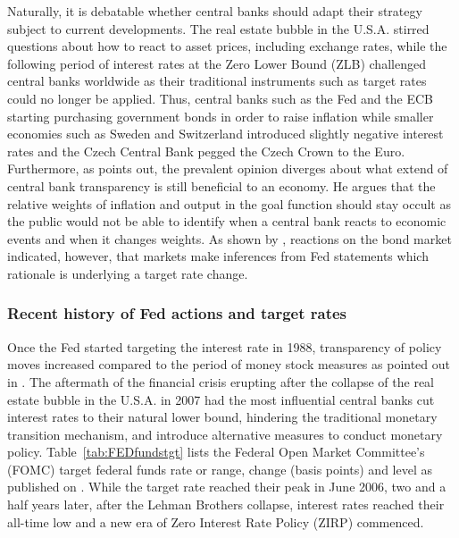 Naturally, it is debatable whether central banks should adapt their strategy subject to current developments. The real estate bubble in the U.S.A. stirred questions about how to react to asset prices, including exchange rates, while the following period of interest rates at the Zero Lower Bound (ZLB) challenged central banks worldwide as their traditional instruments such as target rates could no longer be applied. Thus, central banks such as the Fed and the ECB starting purchasing government bonds in order to raise inflation while smaller economies such as Sweden and Switzerland introduced slightly negative interest rates and the Czech Central Bank pegged the Czech Crown to the Euro. Furthermore, as \textcite{Mishkin.2007} points out, the prevalent opinion diverges about what extend of central bank transparency is still beneficial to an economy. He argues that the relative weights of inflation and output in the goal function should stay occult as the public would not be able to identify when a central bank reacts to economic events and when it changes weights. As shown by \textcite{Ellingsen.2001}, reactions on the bond market indicated, however, that markets make inferences from Fed statements which rationale is underlying a target rate change. %


\subsubsection{Recent history of Fed actions and target rates}

Once the Fed started targeting the interest rate in 1988, transparency of policy moves increased compared to the period of money stock measures as pointed out in \textcite{Ellingsen.2003}. The aftermath of the financial crisis erupting after the collapse of the real estate bubble in the U.S.A. in 2007 had the most influential central banks cut interest rates to their natural lower bound, hindering the traditional monetary transition mechanism, and introduce alternative measures to conduct monetary policy. Table~\vref{tab:FEDfundstgt} lists the Federal Open Market Committee's (FOMC) target federal funds rate or range, change (basis points) and level as published on \textcite{Fed.OMOs}. While the target rate reached their peak in June 2006, two and a half years later, after the Lehman Brothers collapse, interest rates reached their all-time low and a new era of Zero Interest Rate Policy (ZIRP) commenced.

